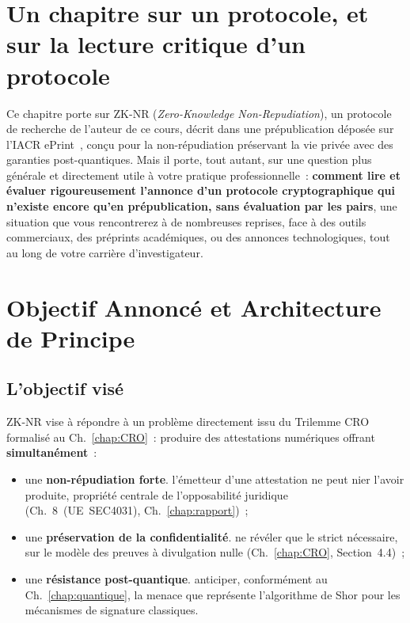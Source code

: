 \bigskip

\section*{Un chapitre sur un protocole, et sur la lecture critique
d'un protocole}

Ce chapitre porte sur ZK-NR (\textit{Zero-Knowledge Non-Repudiation}),
un protocole de recherche de l'auteur de ce cours, décrit dans une
prépublication déposée sur l'IACR ePrint~\cite{minka2025zknr}, conçu
pour la non-répudiation préservant la vie privée avec des garanties
post-quantiques. Mais il porte, tout autant, sur une question plus
générale et directement utile à votre pratique
professionnelle~: \textbf{comment lire et évaluer rigoureusement
l'annonce d'un protocole cryptographique qui n'existe encore qu'en
prépublication, sans évaluation par les pairs}, une situation que vous
rencontrerez à de nombreuses reprises, face à des outils
commerciaux, des préprints académiques, ou des annonces
technologiques, tout au long de votre carrière d'investigateur.

\separateur

\section{Objectif Annoncé et Architecture de Principe}
\label{sec:objectif-architecture}

\subsection{L'objectif visé}

ZK-NR vise à répondre à un problème directement issu du Trilemme CRO
formalisé au Ch.~\ref{chap:CRO}~: produire des attestations
numériques offrant \textbf{simultanément}~:
\begin{itemize}
    \item une \textbf{non-répudiation forte}. l'émetteur d'une
          attestation ne peut nier l'avoir produite, propriété
          centrale de l'opposabilité juridique
          (Ch.~8~(UE~SEC4031), Ch.~\ref{chap:rapport})~;
    \item une \textbf{préservation de la confidentialité}.
          ne révéler que le strict nécessaire, sur le modèle des
          preuves à divulgation nulle (Ch.~\ref{chap:CRO},
          Section~4.4)~;
    \item une \textbf{résistance post-quantique}. anticiper,
          conformément au Ch.~\ref{chap:quantique}, la menace que
          représente l'algorithme de Shor pour les mécanismes
          de signature classiques.
\end{itemize}

